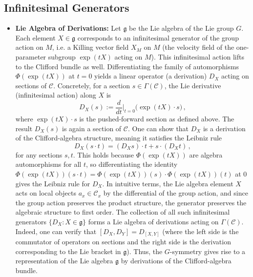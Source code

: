 \documentclass[12pt]{article}
\begin{document}
\subsection{Infinitesimal Generators}
\begin{itemize}
    \item \textbf{Lie Algebra of Derivations:} Let $\mathfrak{g}$ be the Lie algebra of the Lie group $G$. Each element $X \in \mathfrak{g}$ corresponds to an infinitesimal generator of the group action on $M$, i.e. a Killing vector field $X_M$ on $M$ (the velocity field of the one-parameter subgroup $\exp(tX)$ acting on $M$). This infinitesimal action lifts to the Clifford bundle as well. Differentiating the family of automorphisms $\Phi(\exp(tX))$ at $t=0$ yields a linear operator (a derivation) $D_X$ acting on sections of $\mathcal{C}$. Concretely, for a section $s \in \Gamma(\mathcal{C})$, the Lie derivative (infinitesimal action) along $X$ is 
    \[
      D_X(s) := \frac{d}{dt}\Big|_{t=0} \Big(\exp(tX) \cdot s\Big)\,,
    \] 
    where $\exp(tX)\cdot s$ is the pushed-forward section as defined above. The result $D_X(s)$ is again a section of $\mathcal{C}$. One can show that $D_X$ is a derivation of the Clifford-algebra structure, meaning it satisfies the Leibniz rule 
    \[
      D_X(s \cdot t) = (D_X s)\cdot t + s \cdot (D_X t)\,,
    \] 
    for any sections $s,t$. This holds because $\Phi(\exp(tX))$ are algebra automorphisms for all $t$, so differentiating the identity $\Phi(\exp(tX))(s\cdot t) = \Phi(\exp(tX))(s)\cdot \Phi(\exp(tX))(t)$ at $0$ gives the Leibniz rule for $D_X$. In intuitive terms, the Lie algebra element $X$ acts on local objects $a_x \in \mathcal{C}_x$ by the differential of the group action, and since the group action preserves the product structure, the generator preserves the algebraic structure to first order. The collection of all such infinitesimal generators $\{D_X: X\in \mathfrak{g}\}$ forms a Lie algebra of derivations acting on $\Gamma(\mathcal{C})$. Indeed, one can verify that $[D_X, D_Y] = D_{[X,Y]}$ (where the left side is the commutator of operators on sections and the right side is the derivation corresponding to the Lie bracket in $\mathfrak{g}$). Thus, the $G$-symmetry gives rise to a representation of the Lie algebra $\mathfrak{g}$ by derivations of the Clifford-algebra bundle.


\end{itemize}
\end{document}
